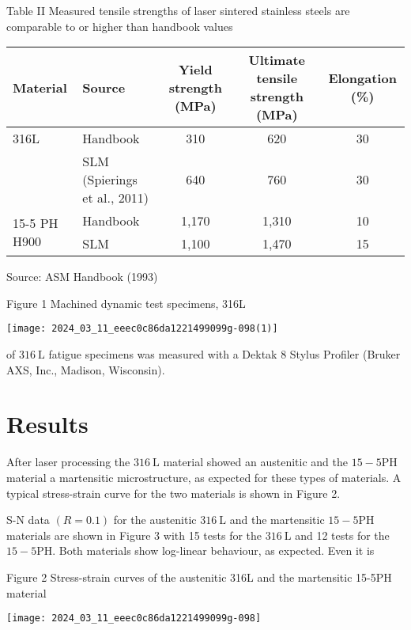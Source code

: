 \documentclass[10pt]{article}
\begin{document}
Table II Measured tensile strengths of laser sintered stainless steels are comparable to or higher than handbook values

\begin{center}
\begin{tabular}{llccc}
\hline
Material & Source & Yield strength (MPa) & Ultimate tensile strength (MPa) & Elongation (\%) \\
\hline
316L & Handbook & 310 & 620 & 30 \\
 & SLM (Spierings et al., 2011) & 640 & 760 & 30 \\
\multirow{2}{*}{15-5 PH H900} & Handbook & 1,170 & 1,310 & 10 \\
 & SLM & 1,100 & 1,470 & 15 \\
\end{tabular}
\end{center}

Source: ASM Handbook (1993)

Figure 1 Machined dynamic test specimens, 316L

\begin{center}
\texttt{[image: 2024\_03\_11\_eeec0c86da1221499099g-098(1)]}
\end{center}

of $316 \mathrm{~L}$ fatigue specimens was measured with a Dektak 8 Stylus Profiler (Bruker AXS, Inc., Madison, Wisconsin).

\section*{Results}
After laser processing the $316 \mathrm{~L}$ material showed an austenitic and the $15-5 \mathrm{PH}$ material a martensitic microstructure, as expected for these types of materials. A typical stress-strain curve for the two materials is shown in Figure 2.

S-N data $(R=0.1)$ for the austenitic $316 \mathrm{~L}$ and the martensitic $15-5 \mathrm{PH}$ materials are shown in Figure 3 with 15 tests for the $316 \mathrm{~L}$ and 12 tests for the $15-5 \mathrm{PH}$. Both materials show log-linear behaviour, as expected. Even it is

Figure 2 Stress-strain curves of the austenitic 316L and the martensitic 15-5PH material

\begin{center}
\texttt{[image: 2024\_03\_11\_eeec0c86da1221499099g-098]}
\end{center}
\end{document}
